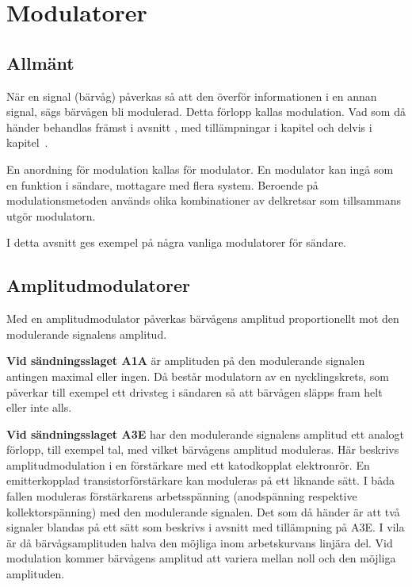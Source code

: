 
\section{Modulatorer}

\subsection{Allmänt}

När en signal (bärvåg) påverkas så att den överför informationen i en annan
signal, sägs bärvågen bli modulerad.
Detta förlopp kallas modulation.
Vad som då händer behandlas främst i avsnitt , med
tillämpningar i kapitel  och delvis i kapitel~.

En anordning för modulation kallas för modulator.
En modulator kan ingå som en funktion i sändare, mottagare med flera system.
Beroende på modulationsmetoden används olika kombinationer av delkretsar som
tillsammans utgör modulatorn.

I detta avsnitt ges exempel på några vanliga modulatorer för sändare.

\subsection{Amplitudmodulatorer}

Med en amplitudmodulator påverkas bärvågens amplitud proportionellt
mot den modulerande signalens amplitud.

\textbf{Vid sändningsslaget A1A} är amplituden på den modulerande signalen
antingen maximal eller ingen.
Då består modulatorn av en nycklingskrets, som påverkar till exempel ett
drivsteg i sändaren så att bärvågen släpps fram helt eller inte alls.

\textbf{Vid sändningsslaget A3E} har den modulerande signalens amplitud
ett analogt förlopp, till exempel tal, med vilket bärvågens amplitud moduleras.
Här beskrivs amplitudmodulation i en förstärkare med ett katodkopplat
elektronrör.
En emitterkopplad transistorförstärkare kan moduleras på ett liknande sätt.
I båda fallen moduleras förstärkarens arbetsspänning (anodspänning respektive 
kollektorspänning) med den modulerande signalen.
Det som då händer är att två signaler blandas på ett sätt som beskrivs i
avsnitt  med tillämpning på A3E.
I vila är då bärvågsamplituden halva den möjliga inom arbetskurvans linjära del.
Vid modulation kommer bärvågens amplitud att variera mellan noll
och den möjliga amplituden.


